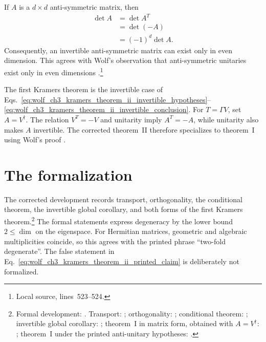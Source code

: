 \documentclass{article}
\begin{document}
If $A$ is a $d\times d$ anti-symmetric matrix, then
\begin{align}
    \det A
        &=\det A^T
    \label{eq:wolf_ch3_kramers_theorem_ii_determinant_transpose}\\
        &=\det(-A)
    \label{eq:wolf_ch3_kramers_theorem_ii_determinant_antisymmetry}\\
        &=(-1)^d\det A.
    \label{eq:wolf_ch3_kramers_theorem_ii_determinant_parity}
\end{align}
Consequently, an invertible anti-symmetric matrix can exist only in even
dimension. This agrees with Wolf's observation that anti-symmetric unitaries
exist only in even dimensions \cite[Chapter~3, discussion following
Theorem~3.1]{Wolf2012Quantum}.\footnote{Local source, lines~523--524.}

The first Kramers theorem is the invertible case of
Eqs.~\ref{eq:wolf_ch3_kramers_theorem_ii_invertible_hypotheses}--%
\ref{eq:wolf_ch3_kramers_theorem_ii_invertible_conclusion}. For
$T=\Gamma V$, set $A=V^\dagger$. The relation $V^T=-V$ and unitarity imply
$A^T=-A$, while unitarity also makes $A$ invertible. The corrected theorem~II
therefore specializes to theorem~I using Wolf's proof
\cite[Chapter~3, Theorems~3.1--3.2]{Wolf2012Quantum}.

\section{The formalization}

The corrected development records transport, orthogonality, the conditional
theorem, the invertible global corollary, and both forms of the first Kramers
theorem.\footnote{Formal development:
.
Transport:
;
orthogonality:
;
conditional theorem:
;
invertible global corollary:
;
theorem~I in matrix form, obtained with $A=V^\dagger$:
;
theorem~I under the printed anti-unitary hypotheses:
.}
The formal statements express degeneracy by the lower bound $2\leq\dim$ on the
eigenspace. For Hermitian matrices, geometric and algebraic multiplicities
coincide, so this agrees with the printed phrase ``two-fold degenerate''. The
false statement in
Eq.~\ref{eq:wolf_ch3_kramers_theorem_ii_printed_claim} is deliberately not
formalized.
\end{document}
